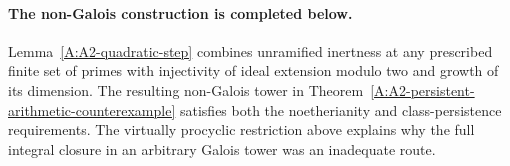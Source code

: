 \paragraph{The non-Galois construction is completed below.}
Lemma~\ref{A:A2-quadratic-step} combines unramified inertness at
any prescribed finite set of primes with injectivity of ideal
extension modulo two and growth of its dimension. The resulting
non-Galois tower in Theorem~\ref{A:A2-persistent-arithmetic-counterexample}
satisfies both the noetherianity and class-persistence requirements.
The virtually procyclic restriction above explains why the full
integral closure in an arbitrary Galois tower was an inadequate route.
